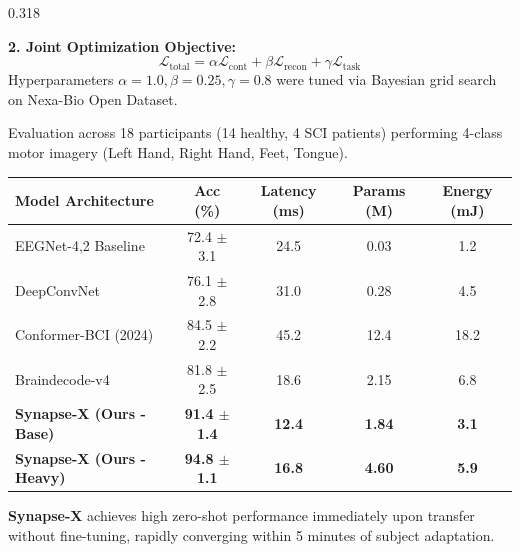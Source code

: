 \documentclass[final]{beamer}
\begin{document}
\begin{frame}[t]
\begin{columns}[t]
\begin{column}{0.318\textwidth}
\begin{tcolorbox}[posterbox, title={\faCalculator{} 3. Mathematical Formulation}]
      \vspace{6pt}
      \textbf{2. Joint Optimization Objective:}
      $$\mathcal{L}_{\text{total}} = \alpha \mathcal{L}_{\text{cont}} + \beta \mathcal{L}_{\text{recon}} + \gamma \mathcal{L}_{\text{task}}$$
      Hyperparameters $\alpha=1.0, \beta=0.25, \gamma=0.8$ were tuned via Bayesian grid search on Nexa-Bio Open Dataset.
    \end{tcolorbox}

    \vspace{10pt}

    \begin{tcolorbox}[posterbox, title={\faTable{} 4. Benchmark Performance Comparison}]
      Evaluation across 18 participants (14 healthy, 4 SCI patients) performing 4-class motor imagery (Left Hand, Right Hand, Feet, Tongue).
      
      \vspace{6pt}
      \centering
      \small
      \begin{tabular}{lcccc}
        \hline
        \rowcolor{primary!10} \textbf{Model Architecture} & \textbf{Acc (\%)} & \textbf{Latency (ms)} & \textbf{Params (M)} & \textbf{Energy (mJ)} \\
        \hline
        EEGNet-4,2 Baseline & 72.4 $\pm$ 3.1 & 24.5 & 0.03 & 1.2 \\
        DeepConvNet & 76.1 $\pm$ 2.8 & 31.0 & 0.28 & 4.5 \\
        Conformer-BCI (2024) & 84.5 $\pm$ 2.2 & 45.2 & 12.4 & 18.2 \\
        Braindecode-v4 & 81.8 $\pm$ 2.5 & 18.6 & 2.15 & 6.8 \\
        \rowcolor{accent!15}
        \textbf{Synapse-X (Ours - Base)} & \textbf{91.4 $\pm$ 1.4} & \textbf{12.4} & \textbf{1.84} & \textbf{3.1} \\
        \rowcolor{highlight!20}
        \textbf{Synapse-X (Ours - Heavy)} & \textbf{94.8 $\pm$ 1.1} & \textbf{16.8} & \textbf{4.60} & \textbf{5.9} \\
        \hline
      \end{tabular}
      \vspace{4pt}
    \end{tcolorbox}

    \vspace{10pt}

    \begin{tcolorbox}[posterbox, title={\faChartLine{} 5. Calibration Data Efficiency}]
      \textbf{Synapse-X} achieves high zero-shot performance immediately upon transfer without fine-tuning, rapidly converging within 5 minutes of subject adaptation.
      

\end{tcolorbox}
\end{column}
\end{columns}
\end{frame}
\end{document}
